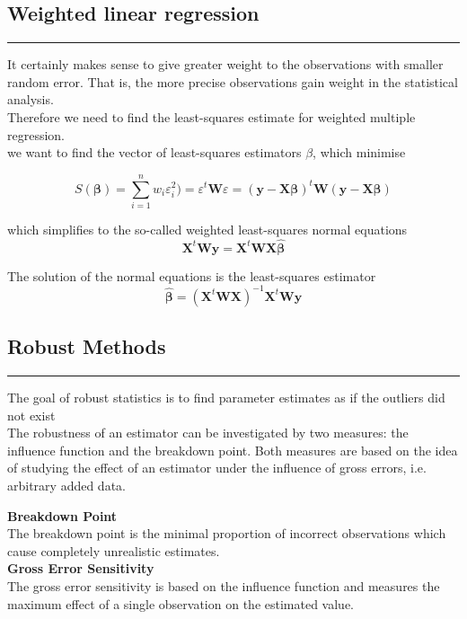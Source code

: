 \subsection{Weighted linear regression}
\noindent\rule[\linienAbstand]{\linewidth}{\linienDicke}
It certainly makes sense to give greater weight to the observations with smaller random error. That is, the more precise observations gain weight in the statistical analysis.\\
Therefore we need to find the least-squares estimate for weighted multiple regression.\\
we want to find the vector of least-squares estimators $\beta$, which minimise

\begin{equation}
  S(\mathbf{\beta}) = \sum^n_{i = 1}w_i\varepsilon^2_i) = \varepsilon^t \mathbf{W} \varepsilon =
  (\mathbf{y}-\mathbf{X}\mathbf{\beta})^t \mathbf{W}(\mathbf{y}-\mathbf{X}\mathbf{\beta})
\end{equation}

which simplifies to the so-called weighted least-squares normal equations
\begin{equation}
  \mathbf{X}^t\mathbf{Wy} = \mathbf{X}^t\mathbf{WX}\hat{\pmb{\beta}}
\end{equation}

The solution of the normal equations is the least-squares estimator
\begin{equation}
  \hat{\pmb{\beta}} = (\mathbf{X}^t\mathbf{WX})^{-1} \mathbf{X}^t\mathbf{Wy}
\end{equation}


\subsection{Robust Methods}
\noindent\rule[\linienAbstand]{\linewidth}{\linienDicke}
The goal of robust statistics is to find parameter estimates as if the outliers did not exist\\

The robustness of an estimator can be investigated by two measures: the influence function and the breakdown point. Both measures are based on the idea of studying the effect of an estimator under the influence of gross errors, i.e. arbitrary added data.

\textbf{Breakdown Point}\\
The breakdown point is the minimal proportion of incorrect observations which cause completely unrealistic estimates.\\
\textbf{Gross Error Sensitivity}\\
The gross error sensitivity is based on the influence function and measures the maximum effect of a single observation on the estimated value.\\

